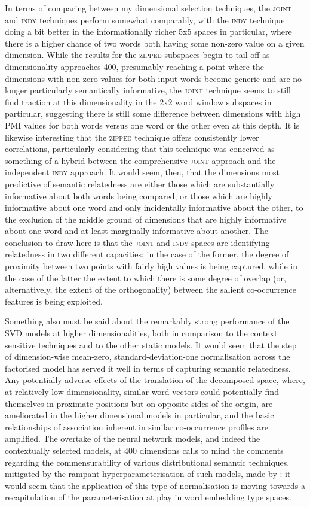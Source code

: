 In terms of comparing between my dimensional selection techniques, the \textsc{joint} and \textsc{indy} techniques perform somewhat comparably, with the \textsc{indy} technique doing a bit better in the informationally richer 5x5 spaces in particular, where there is a higher chance of two words both having some non-zero value on a given dimension.  While the results for the \textsc{zipped} subspaces begin to tail off as dimensionality approaches 400, presumably reaching a point where the dimensions with non-zero values for both input words become generic and are no longer particularly semantically informative, the \textsc{joint} technique seems to still find traction at this dimensionality in the 2x2 word window subspaces in particular, suggesting there is still some difference between dimensions with high PMI values for both words versus one word or the other even at this depth.  It is likewise interesting that the \textsc{zipped} technique offers consistently lower correlations, particularly considering that this technique was conceived as something of a hybrid between the comprehensive \textsc{joint} approach and the independent \textsc{indy} approach.  It would seem, then, that the dimensions most predictive of semantic relatedness are either those which are substantially informative about both words being compared, or those which are highly informative about one word and only incidentally informative about the other, to the exclusion of the middle ground of dimensions that are highly informative about one word and at least marginally informative about another.  The conclusion to draw here is that the \textsc{joint} and \textsc{indy} spaces are identifying relatedness in two different capacities: in the case of the former, the degree of proximity between two points with fairly high values is being captured, while in the case of the latter the extent to which there is some degree of overlap (or, alternatively, the extent of the orthogonality) between the salient co-occurrence features is being exploited.

Something also must be said about the remarkably strong performance of the SVD models at higher dimensionalities, both in comparison to the context sensitive techniques and to the other static models.  It would seem that the step of dimension-wise mean-zero, standard-deviation-one normalisation across the factorised model has served it well in terms of capturing semantic relatedness.  Any potentially adverse effects of the translation of the decomposed space, where, at relatively low dimensionality, similar word-vectors could potentially find themselves in proximate positions but on opposite sides of the origin, are ameliorated in the higher dimensional models in particular, and the basic relationships of association inherent in similar co-occurrence profiles are amplified.  The overtake of the neural network models, and indeed the contextually selected models, at 400 dimensions calls to mind the comments regarding the commensurability of various distributional semantic techniques, mitigated by the rampant hyperparameterisation of such models, made by \cite{LevyEA2014b}: it would seem that the application of this type of normalisation is moving towards a recapitulation of the parameterisation at play in word embedding type spaces.

